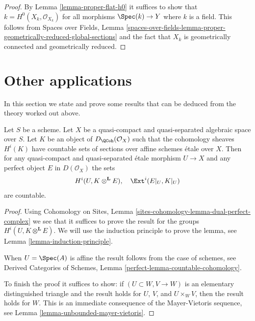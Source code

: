 \begin{proof}
By Lemma \ref{lemma-proper-flat-h0}
it suffices to show that $k = H^0(X_k, \mathcal{O}_{X_k})$
for all morphisms $\Spec(k) \to Y$ where $k$ is a field. This follows from
Spaces over Fields, Lemma
\ref{spaces-over-fields-lemma-proper-geometrically-reduced-global-sections}
and the fact that $X_k$ is geometrically connected and geometrically reduced.
\end{proof}








\section{Other applications}
\label{section-other-applications}

\noindent
In this section we state and prove some results that can be deduced
from the theory worked out above.

\begin{lemma}
\label{lemma-countable-cohomology}
Let $S$ be a scheme. Let $X$ be a quasi-compact and quasi-separated
algebraic space over $S$. Let $K$ be an object of $D_\QCoh(\mathcal{O}_X)$
such that the cohomology sheaves $H^i(K)$ have countable
sets of sections over affine schemes \'etale over $X$.
Then for any quasi-compact and quasi-separated \'etale morphism $U \to X$
and any perfect object $E$ in $D(\mathcal{O}_X)$
the sets
$$
H^i(U, K \otimes^\mathbf{L} E),\quad \Ext^i(E|_U, K|_U)
$$
are countable.
\end{lemma}

\begin{proof}
Using Cohomology on Sites, Lemma
\ref{sites-cohomology-lemma-dual-perfect-complex}
we see that it suffices to prove the result
for the groups $H^i(U, K \otimes^\mathbf{L} E)$.
We will use the induction principle to prove the lemma, see
Lemma \ref{lemma-induction-principle}.

\medskip\noindent
When $U = \Spec(A)$ is affine the result follows from
the case of schemes, see Derived Categories of Schemes,
Lemma \ref{perfect-lemma-countable-cohomology}.

\medskip\noindent
To finish the proof it suffices to show: if $(U \subset W, V \to W)$
is an elementary distinguished triangle
and the result holds for $U$, $V$, and $U \times_W V$, then
the result holds for $W$. This is an immediate consequence
of the Mayer-Vietoris sequence, see
Lemma \ref{lemma-unbounded-mayer-vietoris}.
\end{proof}

